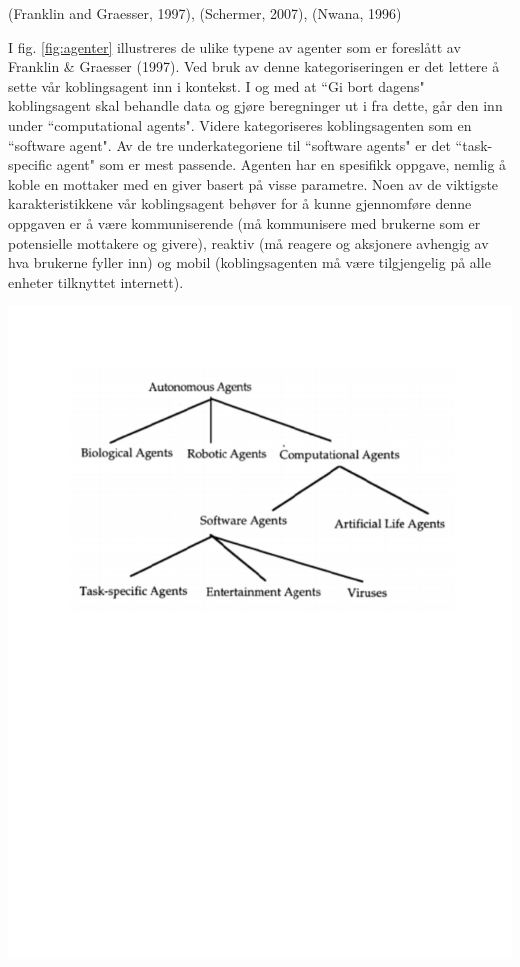(Franklin and Graesser, 1997), (Schermer, 2007), (Nwana, 1996)

I fig. \ref{fig:agenter} illustreres de ulike typene av agenter som er foreslått av Franklin \& Graesser (1997). Ved bruk av denne kategoriseringen er det lettere å sette vår koblingsagent inn i kontekst. I og med at ``Gi bort dagens" koblingsagent skal behandle data og gjøre beregninger ut i fra dette, går den inn under ``computational agents". Videre kategoriseres koblingsagenten som en ``software agent". Av de tre underkategoriene til ``software agents" er det ``task-specific agent" som er mest passende. Agenten har en spesifikk oppgave, nemlig å koble en mottaker med en giver basert på visse parametre. Noen av de viktigste karakteristikkene vår koblingsagent behøver for å kunne gjennomføre denne oppgaven er å være kommuniserende (må kommunisere med brukerne som er potensielle mottakere og givere), reaktiv (må reagere og aksjonere avhengig av hva brukerne fyller inn) og mobil (koblingsagenten må være tilgjengelig på alle enheter tilknyttet internett).


\begin{center}
\includegraphics[clip=true, width=1 \textwidth,
trim=0cm 0cm 0cm 0cm]{agenter.pdf}
\label{fig:agenter}
\end{center}

